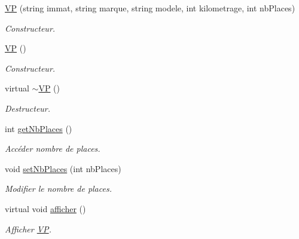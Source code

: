\begin{DoxyCompactItemize}
\item 
\hyperlink{class_v_p_a5891d83afa50a284ac37e84935bb793e}{VP} (string immat, string marque, string modele, int kilometrage, int nbPlaces)
\begin{DoxyCompactList}\small\item\em Constructeur. \item\end{DoxyCompactList}\item 
\hyperlink{class_v_p_ad67a48c8f2f8d3cc8466431d4e0c2949}{VP} ()
\begin{DoxyCompactList}\small\item\em Constructeur. \item\end{DoxyCompactList}\item 
virtual \hyperlink{class_v_p_ae9afa0cd76ea91730282e2ae82d0e203}{$\sim$VP} ()
\begin{DoxyCompactList}\small\item\em Destructeur. \item\end{DoxyCompactList}\item 
int \hyperlink{class_v_p_a6e6a4443cb9f83e0d94e3459b70bd73d}{getNbPlaces} ()
\begin{DoxyCompactList}\small\item\em Accéder nombre de places. \item\end{DoxyCompactList}\item 
void \hyperlink{class_v_p_a678d522ed1085e94814660d93edd9e7c}{setNbPlaces} (int nbPlaces)
\begin{DoxyCompactList}\small\item\em Modifier le nombre de places. \item\end{DoxyCompactList}\item 
virtual void \hyperlink{class_v_p_a3af04349e81a3c643b497898ad19ef7a}{afficher} ()
\begin{DoxyCompactList}\small\item\em Afficher \hyperlink{class_v_p}{VP}. \item\end{DoxyCompactList}\end{DoxyCompactItemize}


